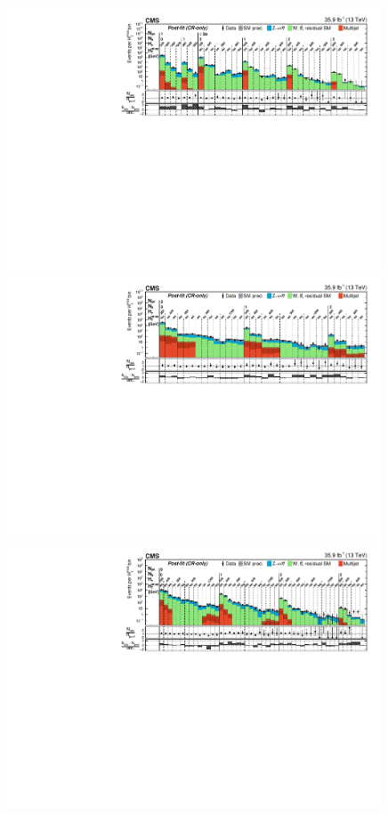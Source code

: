 \begin{figure}[!p]
  \centering
  \includegraphics[width=0.99\textwidth]{Figures/CMS-SUS-16-038_Figure_001-a.pdf}\\
  \includegraphics[width=0.99\textwidth]{Figures/CMS-SUS-16-038_Figure_001-b.pdf}\\
  \includegraphics[width=0.99\textwidth]{Figures/CMS-SUS-16-038_Figure_001-c.pdf}\\

\end{figure}
